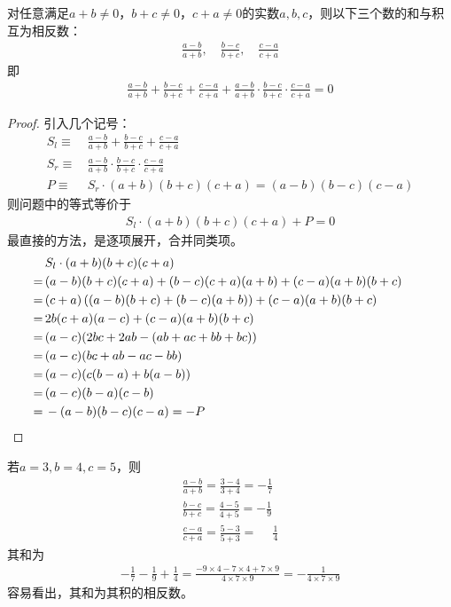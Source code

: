 \begin{example}\label{ex:sum-is-negative-to-product}
  对任意满足$a+b\ne0$，$b+c\ne0$，$c+a\ne0$的实数$a,b,c$，则以下三个数的和与积互为相反数：
  \begin{align*}
    \frac{a-b}{a+b},\quad \frac{b-c}{b+c},\quad \frac{c-a}{c+a}
  \end{align*}
  即
  \begin{align*}
    \frac{a-b}{a+b} + \frac{b-c}{b+c} + \frac{c-a}{c+a} 
    + \frac{a-b}{a+b} \cdot \frac{b-c}{b+c} \cdot \frac{c-a}{c+a} = 0
  \end{align*}
\end{example}
\begin{proof}
  引入几个记号：
  \begin{align*}
    S_{l}\equiv&\, \frac{a-b}{a+b} + \frac{b-c}{b+c} + \frac{c-a}{c+a} \\
    S_{r}\equiv&\,\frac{a-b}{a+b} \cdot \frac{b-c}{b+c} \cdot \frac{c-a}{c+a}\\
    P\equiv&\,S_{r}\cdot (a+b)(b+c)(c+a) = (a-b)(b-c)(c-a)
  \end{align*}
  则问题中的等式等价于
  \begin{align*}
    S_{l}\cdot (a+b)(b+c)(c+a) + P = 0
  \end{align*}
  最直接的方法，是逐项展开，合并同类项。
  \begin{align*}
     &\, S_{l}\cdot (a+b)(b+c)(c+a)\\
    =&\, (a-b)(b+c)(c+a) + (b-c)(c+a)(a+b) + (c-a)(a+b)(b+c)\\
    =&\, (c+a)\left( (a-b)(b+c) + (b-c)(a+b) \right) + (c-a)(a+b)(b+c)\\
    =&\, 2b(c+a)(a-c) + (c-a)(a+b)(b+c)\\
    =&\, (a-c)(2bc+2ab - (ab+ac+bb+bc))\\
    =&\, (a-c)(bc+ab - ac-bb)\\
    =&\, (a-c)(c(b-a)+b(a-b))\\
    =&\, (a-c)(b-a)(c-b)\\
    =&\, -(a-b)(b-c)(c-a) = -P&&\qedhere
  \end{align*}
\end{proof}

\begin{example}
  若$a=3,b=4,c=5$，则
  \begin{align*}
    \frac{a-b}{a+b} = \frac{3-4}{3+4} = -\frac17\\
    \frac{b-c}{b+c} = \frac{4-5}{4+5} = -\frac19\\
    \frac{c-a}{c+a} = \frac{5-3}{5+3} = \phantom{-}\frac14
  \end{align*}
  其和为
  \begin{align*}
    -\frac17 - \frac19 + \frac14 = \frac{-9\times4 - 7\times4 + 7\times9}{4\times7\times9} = -\frac1{4\times7\times9}
  \end{align*}
  容易看出，其和为其积的相反数。
\end{example}